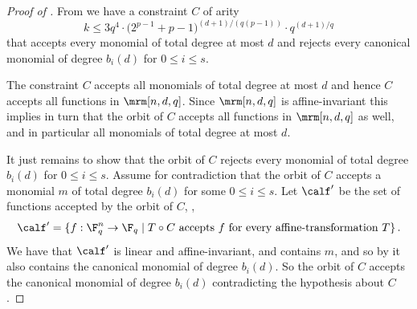 \begin{proof}[Proof of ]
{}From 
we have a constraint $C$ of arity
\[k \leq 3q^4 \cdot \big(2^{p-1}+p-1\big)^{(d+1)/(q(p-1))} \cdot q^{(d+1)/q}\] that
accepts every monomial of total degree at most
$d$ and rejects every canonical monomial of degree $b_i(d)$ for $0 \leq i \leq s$.

%
%
The constraint $C$ accepts all monomials
of total degree at most $d$ and hence $C$ accepts all functions in $\mrm[n,d,q]$.
Since $\mrm[n,d,q]$ is affine-invariant this implies in turn that the orbit of $C$ accepts all functions in $\mrm[n,d,q]$ as well, and in particular all monomials of total degree at most $d$.

It just remains to show that the orbit of $C$ rejects every monomial of total degree $b_i(d)$ for $0 \leq i\leq s$.
Assume for contradiction that the orbit of $C$ accepts a monomial $m$ of total degree $b_i(d)$ for some
$0 \leq i \leq s$.
Let $\calf'$ be the set of functions accepted by the orbit of
$C$, \ie,
$$\calf' = \{f : \F_q^n \to \F_q \;|\;
\mbox{$T \circ C$~accepts~$f$~for~every~affine-transformation~$T\}$}\,.$$
We have that $\calf'$ is linear and affine-invariant, and contains $m$,
and so by  it also contains
the canonical monomial of degree $b_i(d)$. So the orbit of $C$ accepts the canonical monomial of degree $b_i(d)$ contradicting the
hypothesis about $C$.

%
%
\end{proof}
